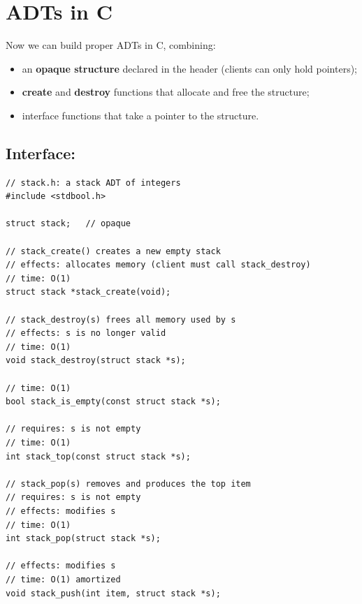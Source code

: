 \section{ADTs in C}

Now we can build proper ADTs in C, combining:
\begin{itemize}
  \item an \textbf{opaque structure} declared in the header (clients can only hold pointers);
  \item \textbf{create} and \textbf{destroy} functions that allocate and free the structure;
  \item interface functions that take a pointer to the structure.
\end{itemize}

\subsection{Interface: }
\begin{lstlisting}[style=c]
// stack.h: a stack ADT of integers
#include <stdbool.h>

struct stack;   // opaque

// stack_create() creates a new empty stack
// effects: allocates memory (client must call stack_destroy)
// time: O(1)
struct stack *stack_create(void);

// stack_destroy(s) frees all memory used by s
// effects: s is no longer valid
// time: O(1)
void stack_destroy(struct stack *s);

// time: O(1)
bool stack_is_empty(const struct stack *s);

// requires: s is not empty
// time: O(1)
int stack_top(const struct stack *s);

// stack_pop(s) removes and produces the top item
// requires: s is not empty
// effects: modifies s
// time: O(1)
int stack_pop(struct stack *s);

// effects: modifies s
// time: O(1) amortized
void stack_push(int item, struct stack *s);
\end{lstlisting}

